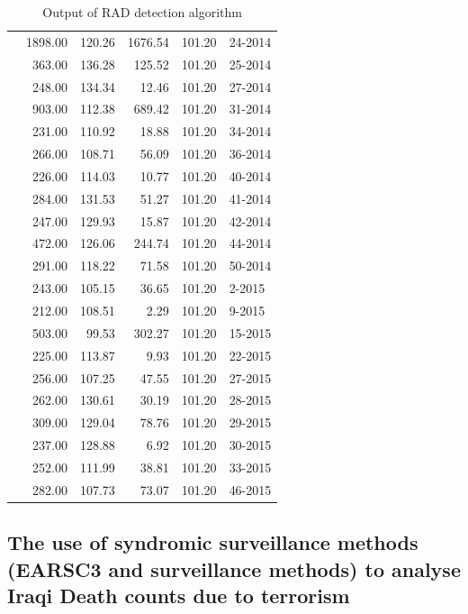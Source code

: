 \begin{table}[ht]
\begin{tabular}{rrrrrl}
 & 1898.00 & 120.26 & 1676.54 & 101.20 & 24-2014 \\ 
 & 363.00 & 136.28 & 125.52 & 101.20 & 25-2014 \\ 
 & 248.00 & 134.34 & 12.46 & 101.20 & 27-2014 \\ 
 & 903.00 & 112.38 & 689.42 & 101.20 & 31-2014 \\ 
 & 231.00 & 110.92 & 18.88 & 101.20 & 34-2014 \\ 
 & 266.00 & 108.71 & 56.09 & 101.20 & 36-2014 \\ 
 & 226.00 & 114.03 & 10.77 & 101.20 & 40-2014 \\ 
 & 284.00 & 131.53 & 51.27 & 101.20 & 41-2014 \\ 
 & 247.00 & 129.93 & 15.87 & 101.20 & 42-2014 \\ 
 & 472.00 & 126.06 & 244.74 & 101.20 & 44-2014 \\ 
 & 291.00 & 118.22 & 71.58 & 101.20 & 50-2014 \\ 
 & 243.00 & 105.15 & 36.65 & 101.20 & 2-2015 \\ 
 & 212.00 & 108.51 & 2.29 & 101.20 & 9-2015 \\ 
 & 503.00 & 99.53 & 302.27 & 101.20 & 15-2015 \\ 
 & 225.00 & 113.87 & 9.93 & 101.20 & 22-2015 \\ 
 & 256.00 & 107.25 & 47.55 & 101.20 & 27-2015 \\ 
 & 262.00 & 130.61 & 30.19 & 101.20 & 28-2015 \\ 
 & 309.00 & 129.04 & 78.76 & 101.20 & 29-2015 \\ 
 & 237.00 & 128.88 & 6.92 & 101.20 & 30-2015 \\ 
 & 252.00 & 111.99 & 38.81 & 101.20 & 33-2015 \\ 
 & 282.00 & 107.73 & 73.07 & 101.20 & 46-2015 \\ 
   \hline
\end{tabular}
\caption{Output of RAD detection algorithm}
\label{tab:RADTABLE}
\end{table}

\subsection{The use of syndromic surveillance methods (EARSC3 and surveillance methods) to analyse Iraqi Death counts due to terrorism} 

